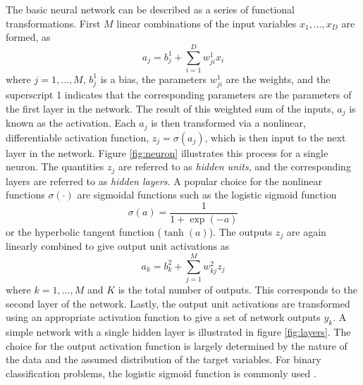 The basic neural network can be described as a series of functional transformations. First $M$ linear combinations of the input variables $x_1,\dots,x_D$ are formed, as
\begin{equation}
a_j = b_j^{1}+\sum_{i=1}^{D}w_{ji}^{1}x_i
\end{equation}
where $j=1,\dots,M$, $b_j^1$ is a bias, the parameters $w_{ji}^1$ are the weights, and the superscript 1 indicates that the corresponding parameters are the parameters of the first layer in the network. The result of this weighted sum of the inputs, $a_j$ is known as the activation. Each $a_j$ is then transformed via a nonlinear, differentiable activation function, $z_j=\sigma(a_j)$, which is then input to the next layer in the network. Figure \ref{fig:neuron} illustrates this process for a single neuron. The quantities $z_j$ are referred to as \textit{hidden units}, and the corresponding layers are referred to as \textit{hidden layers}. A popular choice for the nonlinear functions $\sigma(\cdot)$ are sigmoidal functions such as the logistic sigmoid function
\begin{equation}
\sigma(a)=\frac{1}{1+\exp(-a)}
\end{equation}
or the hyperbolic tangent function ($\tanh(a)$). The outputs $z_j$ are again linearly combined to give output unit activations as
\begin{equation}
a_k = b_k^2+\sum_{j=1}^{M}w_{kj}^2z_j
\end{equation} 
where $k=1,\dots,M$ and $K$ is the total number of outputs. This corresponds to the second layer of the network. Lastly, the output unit activations are transformed using an appropriate activation function to give a set of network outputs $y_k$. A simple network with a single hidden layer is illustrated in figure \ref{fig:layers}. The choice for the output activation function is largely determined by the nature of the data and the assumed distribution of the target variables. For binary classification problems, the logistic sigmoid function is commonly used \cite{machine_learning}.
